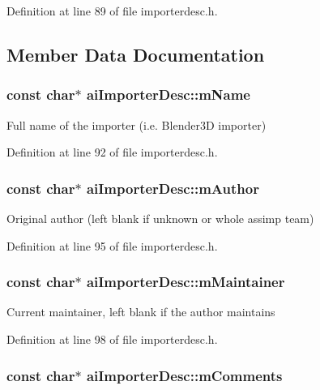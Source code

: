Definition at line 89 of file importerdesc.h.

\subsection{Member Data Documentation}
\hypertarget{structai_importer_desc_2a9d5fd818c01bba1a0a782722ab9495}{
\subsubsection[mName]{\setlength{\rightskip}{0pt plus 5cm}const char$\ast$ {\bf aiImporterDesc::mName}}}
\label{structai_importer_desc_2a9d5fd818c01bba1a0a782722ab9495}


Full name of the importer (i.e. Blender3D importer) 

Definition at line 92 of file importerdesc.h.\hypertarget{structai_importer_desc_8e050453324b1e855701c7c082c1b24b}{
\subsubsection[mAuthor]{\setlength{\rightskip}{0pt plus 5cm}const char$\ast$ {\bf aiImporterDesc::mAuthor}}}
\label{structai_importer_desc_8e050453324b1e855701c7c082c1b24b}


Original author (left blank if unknown or whole assimp team) 

Definition at line 95 of file importerdesc.h.\hypertarget{structai_importer_desc_53bf0ecb36ce0b97018b4b6bd2748f02}{
\subsubsection[mMaintainer]{\setlength{\rightskip}{0pt plus 5cm}const char$\ast$ {\bf aiImporterDesc::mMaintainer}}}
\label{structai_importer_desc_53bf0ecb36ce0b97018b4b6bd2748f02}


Current maintainer, left blank if the author maintains 

Definition at line 98 of file importerdesc.h.\hypertarget{structai_importer_desc_2d8ad562f6c18ee9e8bfdb2da4871118}{
\subsubsection[mComments]{\setlength{\rightskip}{0pt plus 5cm}const char$\ast$ {\bf aiImporterDesc::mComments}}}
\label{structai_importer_desc_2d8ad562f6c18ee9e8bfdb2da4871118}


